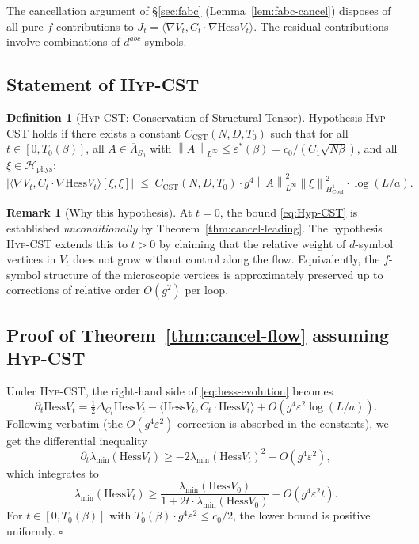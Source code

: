 \documentclass[11pt,a4paper]{amsart}
\theoremstyle{definition}
\newtheorem{definition}[theorem]{Definition}
\newtheorem{remark}[theorem]{Remark}
\newcommand{\norm}[1]{\left\lVert#1\right\rVert}
\newcommand{\Coul}{\mathrm{Coul}}
\newcommand{\Hess}{\mathrm{Hess}}
\begin{document}
The cancellation argument of \S\ref{sec:fabc} (Lemma~\ref{lem:fabc-cancel})
disposes of all pure-$f$ contributions to $J_t = \langle \nabla V_t, C_t \cdot \nabla \Hess V_t\rangle$.
The residual contributions involve combinations of $d^{abc}$ symbols.

\subsection{Statement of \textsc{Hyp-CST}}

\begin{definition}[\textsc{Hyp-CST}: Conservation of Structural Tensor]\label{def:Hyp-CST}
Hypothesis \textsc{Hyp-CST} holds if there exists a constant $C_{\mathrm{CST}}(N, D, T_0)$
such that for all $t \in [0, T_0(\beta)]$, all $A \in \overline\Lambda_{S_0}$
with $\norm{A}_{L^\infty} \leq \varepsilon^*(\beta) = c_0/(C_1\sqrt{N\beta})$,
and all $\xi \in \mathcal H_{\mathrm{phys}}$:
\begin{equation}\label{eq:Hyp-CST}
\bigl|\langle \nabla V_t, C_t \cdot \nabla \Hess V_t\rangle [\xi, \xi]\bigr|
\;\leq\; C_{\mathrm{CST}}(N, D, T_0) \cdot g^4 \norm{A}^2_{L^\infty} \norm{\xi}^2_{H^1_{\Coul}} \cdot \log(L/a).
\end{equation}
\end{definition}

\begin{remark}[Why this hypothesis]\label{rem:why-CST}
At $t = 0$, the bound \eqref{eq:Hyp-CST} is established
\emph{unconditionally} by Theorem~\ref{thm:cancel-leading}. The
hypothesis \textsc{Hyp-CST} extends this to $t > 0$ by claiming that
the relative weight of $d$-symbol vertices in $V_t$ does not grow
without control along the flow. Equivalently, the $f$-symbol structure
of the microscopic vertices is approximately preserved up to corrections
of relative order $O(g^2)$ per loop.
\end{remark}

\subsection{Proof of Theorem~\ref{thm:cancel-flow} assuming \textsc{Hyp-CST}}

Under \textsc{Hyp-CST}, the right-hand side of \eqref{eq:hess-evolution}
becomes
\[
\partial_t \Hess V_t = \tfrac{1}{2}\Delta_{C_t} \Hess V_t - \langle \Hess V_t, C_t \cdot \Hess V_t\rangle + O(g^4 \varepsilon^2 \log(L/a)).
\]
Following \cite[\S 4.2]{BauerschmidtDagallier2024} verbatim (the
$O(g^4 \varepsilon^2)$ correction is absorbed in the constants),
we get the differential inequality
\[
\partial_t \lambda_{\min}(\Hess V_t) \geq -2 \lambda_{\min}(\Hess V_t)^2 - O(g^4 \varepsilon^2),
\]
which integrates to
\[
\lambda_{\min}(\Hess V_t) \geq \frac{\lambda_{\min}(\Hess V_0)}{1 + 2 t \cdot \lambda_{\min}(\Hess V_0)} - O(g^4 \varepsilon^2 t).
\]
For $t \in [0, T_0(\beta)]$ with $T_0(\beta) \cdot g^4 \varepsilon^2 \leq c_0/2$,
the lower bound is positive uniformly. \hfill $\square$
\end{document}
